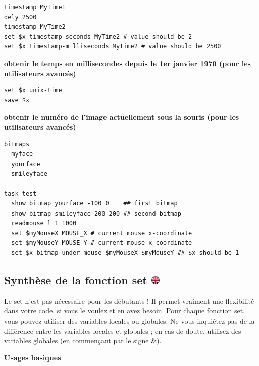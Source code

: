 \documentclass[
]{book}
\begin{document}
\begin{verbatim}
timestamp MyTime1
dely 2500
timestamp MyTime2
set $x timestamp-seconds MyTime2 # value should be 2
set $x timestamp-milliseconds MyTime2 # value should be 2500
\end{verbatim}

\textbf{obtenir le temps en millisecondes depuis le 1er janvier 1970 (pour les utilisateurs avancés)}

\begin{verbatim}
set $x unix-time
save $x
\end{verbatim}

\textbf{obtenir le numéro de l'image actuellement sous la souris (pour les utilisateurs avancés)}

\begin{verbatim}
bitmaps
  myface
  yourface
  smileyface

task test
  show bitmap yourface -100 0    ## first bitmap
  show bitmap smileyface 200 200 ## second bitmap
  readmouse l 1 1000
  set $myMouseX MOUSE_X # current mouse x-coordinate
  set $myMouseY MOUSE_Y # current mouse x-coordinate
  set $x bitmap-under-mouse $myMouseX $myMouseY ## $x should be 1
\end{verbatim}

\hypertarget{synthuxe8se-de-la-fonction-set}{%
\subsection[Synthèse de la fonction set ]{\texorpdfstring{Synthèse de la fonction set \href{https://www.psytoolkit.org/doc3.2.0/syntax.html\#_summary_of_set}{\protect\includegraphics{img/ukflag.png}}}{Synthèse de la fonction set }}\label{synthuxe8se-de-la-fonction-set}}

Le set n'est pas nécessaire pour les débutants ! Il permet vraiment une flexibilité dans votre code, si vous le voulez et en avez besoin.
Pour chaque fonction set, vous pouvez utiliser des variables locales ou globales. Ne vous inquiétez pas de la différence entre les variables locales et globales ; en cas de doute, utilisez des variables globales (en commençant par le signe \&).

\textbf{Usages basiques}
\end{document}
